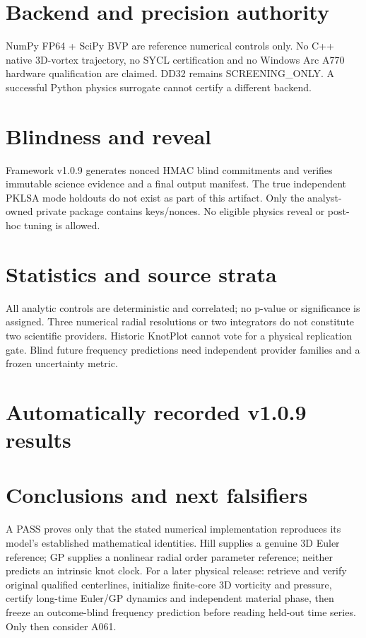 \documentclass[10pt,a4paper]{article}
\begin{document}
\section{Backend and precision authority}
NumPy FP64 + SciPy BVP are reference numerical controls only. No C++ native 3D-vortex trajectory, no SYCL certification and no Windows Arc A770 hardware qualification are claimed. DD32 remains SCREENING\_ONLY. A successful Python physics surrogate cannot certify a different backend.
\section{Blindness and reveal}
Framework v1.0.9 generates nonced HMAC blind commitments and verifies immutable science evidence and a final output manifest. The true independent PKLSA mode holdouts do not exist as part of this artifact. Only the analyst-owned private package contains keys/nonces. No eligible physics reveal or post-hoc tuning is allowed.
\section{Statistics and source strata}
All analytic controls are deterministic and correlated; no p-value or significance is assigned. Three numerical radial resolutions or two integrators do not constitute two scientific providers. Historic KnotPlot cannot vote for a physical replication gate. Blind future frequency predictions need independent provider families and a frozen uncertainty metric.
\section{Automatically recorded v1.0.9 results}
\section{Conclusions and next falsifiers}
A PASS proves only that the stated numerical implementation reproduces its model's established mathematical identities. Hill supplies a genuine 3D Euler reference; GP supplies a nonlinear radial order parameter reference; neither predicts an intrinsic knot clock. For a later physical release: retrieve and verify original qualified centerlines, initialize finite-core 3D vorticity and pressure, certify long-time Euler/GP dynamics and independent material phase, then freeze an outcome-blind frequency prediction before reading held-out time series. Only then consider A061.
\end{document}
